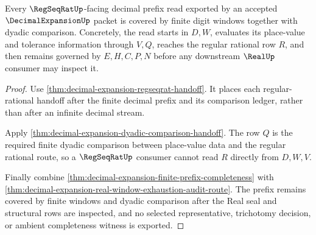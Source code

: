 \begin{theorem}
\label{thm:decimal-expansion-regseqrat-prefix-coverage}
Every $\RegSeqRatUp$-facing decimal prefix read exported by an accepted $\DecimalExpansionUp$ packet is covered by finite digit windows together with dyadic comparison. Concretely, the read starts in $D,W$, evaluates its place-value and tolerance information through $V,Q$, reaches the regular rational row $R$, and then remains governed by $E,H,C,P,N$ before any downstream $\RealUp$ consumer may inspect it.
\end{theorem}
\begin{proof}
Use \autoref{thm:decimal-expansion-regseqrat-handoff}. It places each regular-rational handoff after the finite decimal prefix and its comparison ledger, rather than after an infinite decimal stream.

Apply \autoref{thm:decimal-expansion-dyadic-comparison-handoff}. The row $Q$ is the required finite dyadic comparison between place-value data and the regular rational route, so a $\RegSeqRatUp$ consumer cannot read $R$ directly from $D,W,V$.

Finally combine \autoref{thm:decimal-expansion-finite-prefix-completeness} with \autoref{thm:decimal-expansion-real-window-exhaustion-audit-route}. The prefix remains covered by finite windows and dyadic comparison after the Real seal and structural rows are inspected, and no selected representative, trichotomy decision, or ambient completeness witness is exported.
\end{proof}

